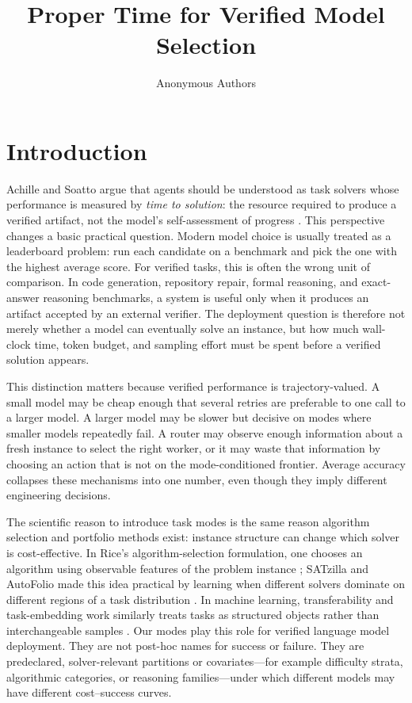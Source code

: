 \documentclass[10pt,twocolumn]{article}
\title{Proper Time for Verified Model Selection}
\author{%
  Anonymous Authors \\
  \texttt{}
}
\theoremstyle{definition}
\theoremstyle{plain}
\theoremstyle{remark}
\begin{document}
\maketitle

\begin{abstract}
\end{abstract}

\section{Introduction}

Achille and Soatto argue that agents should be understood as task solvers whose
performance is measured by \emph{time to solution}: the resource required to
produce a verified artifact, not the model's self-assessment of progress
\citep{achille2025agents}.  This perspective changes a basic practical
question.  Modern model choice is usually treated as a leaderboard problem: run
each candidate on a benchmark and pick the one with the highest average score.
For verified tasks, this is often the wrong unit of comparison.  In code
generation, repository repair, formal reasoning, and exact-answer reasoning
benchmarks, a system is useful only when it produces an artifact accepted by an
external verifier.  The deployment question is therefore not merely whether a
model can eventually solve an instance, but how much wall-clock time, token
budget, and sampling effort must be spent before a verified solution appears.

This distinction matters because verified performance is trajectory-valued.  A
small model may be cheap enough that several retries are preferable to one call
to a larger model.  A larger model may be slower but decisive on modes where
smaller models repeatedly fail.  A router may observe enough information about a
fresh instance to select the right worker, or it may waste that information by
choosing an action that is not on the mode-conditioned frontier.  Average
accuracy collapses these mechanisms into one number, even though they imply
different engineering decisions.

The scientific reason to introduce task modes is the same reason algorithm
selection and portfolio methods exist: instance structure can change which
solver is cost-effective.  In Rice's algorithm-selection formulation, one
chooses an algorithm using observable features of the problem instance
\citep{rice1976algorithm}; SATzilla and AutoFolio made this idea practical by
learning when different solvers dominate on different regions of a task
distribution \citep{xu2012satzilla,lindauer2015autofolio}.  In machine
learning, transferability and task-embedding work similarly treats tasks as
structured objects rather than interchangeable samples
\citep{achille2019task2vec}.  Our modes play this role for verified language
model deployment.  They are not post-hoc names for success or failure.  They
are predeclared, solver-relevant partitions or covariates---for example
difficulty strata, algorithmic categories, or reasoning families---under which
different models may have different cost--success curves.
\end{document}
